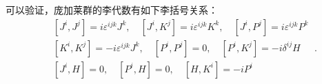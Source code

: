 可以验证，庞加莱群的李代数有如下李括号关系：
\begin{equation}
\begin{aligned}
& {\left[J^i, J^j\right]=i \varepsilon^{i j k} J^k, \quad\left[J^i, K^j\right]=i \varepsilon^{i j k} K^k, \quad\left[J^i, P^j\right]=i \varepsilon^{i j k} P^k} \\
& {\left[K^i, K^j\right]=-i \varepsilon^{i j k} J^k, \quad\left[P^i, P^j\right]=0, \quad\left[P^i, K^j\right]=-i \delta^{i j} H} \\
& {\left[J^i, H\right]=0, \quad\left[P^i, H\right]=0, \quad\left[H, K^i\right]=-i P^i}
\end{aligned}~.
\end{equation}

